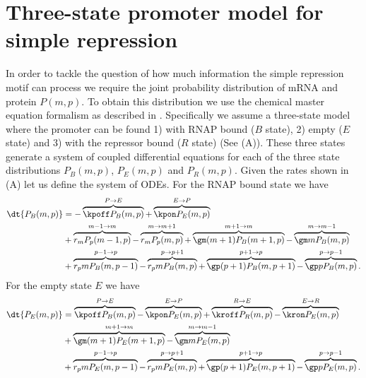 \section{Three-state promoter model for simple repression}\label{supp_model}

In order to tackle the question of how much information the simple repression
motif can process we require the joint probability distribution of mRNA and
protein $P(m, p)$. To obtain this distribution we use the chemical master
equation formalism as described in . Specifically we assume a
three-state model where the promoter can be found 1) with RNAP bound ($B$
state), 2) empty ($E$ state) and 3) with the repressor bound ($R$ state) (See
(A)). These three states generate a system of coupled
differential equations for each of the three state distributions $P_B(m, p)$,
$P_E(m, p)$ and $P_R(m, p)$. Given the rates shown in
(A) let us define the system of ODEs. For the RNAP
bound state we have
\begin{equation}
  \begin{aligned}
    \dt{P_B(m, p)} &=
    - \overbrace{\kpoff P_B(m, p)}^{P \rightarrow E} %
    + \overbrace{\kpon P_E(m, p)}^{E \rightarrow P}\\ %
    &+ \overbrace{r_m P_p(m-1, p)}^{m-1 \rightarrow m} %
    - \overbrace{r_m P_p(m, p)}^{m \rightarrow m+1}%
    + \overbrace{\gm (m + 1) P_B(m+1 , p)}^{m+1 \rightarrow m} %
    - \overbrace{\gm m P_B(m , p)}^{m \rightarrow m-1}\\ %
    &+ \overbrace{r_p m P_B(m, p - 1)}^{p-1 \rightarrow p} %
    - \overbrace{r_p m P_B(m, p)}^{p \rightarrow p+1} %
    + \overbrace{\gp (p + 1) P_B(m, p + 1)}^{p + 1 \rightarrow p} %
    - \overbrace{\gp p P_B(m, p)}^{p \rightarrow p-1}. %
  \end{aligned}
\end{equation}
For the empty state $E$ we have
\begin{equation}
  \begin{aligned}
    \dt{P_E(m, p)} &=
    \overbrace{\kpoff P_B(m, p)}^{P \rightarrow E} %
    - \overbrace{\kpon P_E(m, p)}^{E \rightarrow P} %
    + \overbrace{\kroff P_R(m, p)}^{R \rightarrow E} %
    - \overbrace{\kron P_E(m, p)}^{E \rightarrow R}\\ %
    &+ \overbrace{\gm (m + 1) P_E(m+1 , p)}^{m+1 \rightarrow m} %
    - \overbrace{\gm m P_E(m , p)}^{m \rightarrow m-1}\\ %
    &+ \overbrace{r_p m P_E(m, p - 1)}^{p-1 \rightarrow p} %
    - \overbrace{r_p m P_E(m, p)}^{p \rightarrow p+1} %
    + \overbrace{\gp (p + 1) P_E(m, p + 1)}^{p + 1 \rightarrow p} %
    - \overbrace{\gp p P_E(m, p)}^{p \rightarrow p-1}. %
  \end{aligned}
\end{equation}
